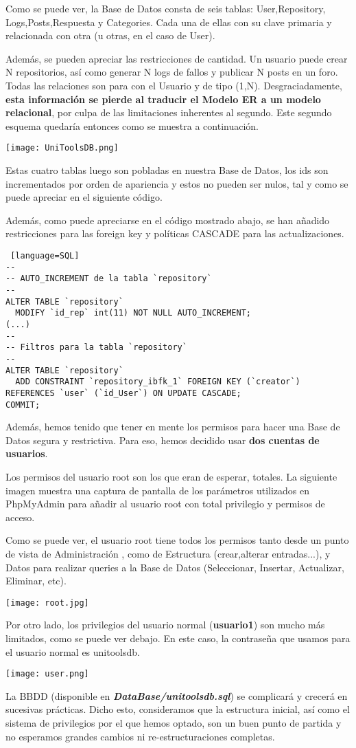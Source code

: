 \documentclass[12pt]{report}
\begin{document}
Como se puede ver, la Base de Datos consta de seis tablas: User,Repository, Logs,Posts,Respuesta y Categories. Cada una de ellas con su clave primaria y relacionada con otra (u otras, en el caso de User). 

Además, se pueden apreciar las restricciones de cantidad. Un usuario puede crear N repositorios, así como generar N logs de fallos y publicar N posts en un foro. Todas las relaciones son para con el Usuario y de tipo (1,N). Desgraciadamente, \textbf{esta información se pierde al traducir el Modelo ER a un modelo relacional}, por culpa de las limitaciones inherentes al segundo. Este segundo esquema quedaría entonces como se muestra a continuación.
\newline

\texttt{[image: UniToolsDB.png]}

Estas cuatro tablas luego son pobladas en nuestra Base de Datos, los ids son incrementados por orden de apariencia y estos no pueden ser nulos, tal y como se puede apreciar en el siguiente código.

Además, como puede apreciarse en el código mostrado abajo, se han añadido restricciones para las foreign key y políticas CASCADE para las actualizaciones.
\newline

\begin{lstlisting} [language=SQL]
--
-- AUTO_INCREMENT de la tabla `repository`
--
ALTER TABLE `repository`
  MODIFY `id_rep` int(11) NOT NULL AUTO_INCREMENT;
(...)
--
-- Filtros para la tabla `repository`
--
ALTER TABLE `repository`
  ADD CONSTRAINT `repository_ibfk_1` FOREIGN KEY (`creator`) REFERENCES `user` (`id_User`) ON UPDATE CASCADE;
COMMIT;
\end{lstlisting}

Además, hemos tenido que tener en mente los permisos para hacer una Base de Datos segura y restrictiva. Para eso, hemos decidido usar \textbf{dos cuentas de usuarios}.

Los permisos del usuario root son los que eran de esperar, totales. La siguiente imagen muestra una captura de pantalla de los parámetros utilizados en PhpMyAdmin para añadir al usuario root con total privilegio y permisos de acceso.

Como se puede ver, el usuario root tiene todos los permisos tanto desde un punto de vista de Administración , como de Estructura (crear,alterar entradas...), y Datos para realizar queries a la Base de Datos (Seleccionar, Insertar, Actualizar, Eliminar, etc).


\texttt{[image: root.jpg]}

Por otro lado, los privilegios del usuario normal (\textbf{usuario1}) son mucho más limitados, como se puede ver debajo. En este caso, la contraseña que usamos para el usuario normal es unitoolsdb.

\texttt{[image: user.png]}

La BBDD (disponible en \textbf{\textit{DataBase/unitoolsdb.sql}}) se complicará y crecerá en sucesivas prácticas. Dicho esto, consideramos que la estructura inicial, así como el sistema de privilegios por el que hemos optado, son un buen punto de partida y no esperamos grandes cambios ni re-estructuraciones completas.
\end{document}
